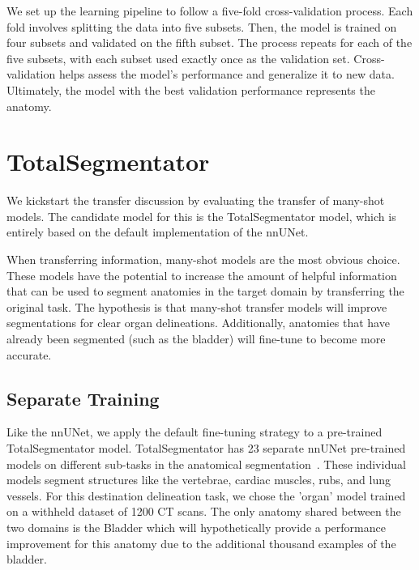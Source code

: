 \documentclass[11pt,twoside]{report}
\begin{document}
We set up the learning pipeline to follow a five-fold cross-validation process. Each fold involves splitting the data into five subsets. Then, the model is trained on four subsets and validated on the fifth subset. The process repeats for each of the five subsets, with each subset used exactly once as the validation set. Cross-validation helps assess the model's performance and generalize it to new data. Ultimately, the model with the best validation performance represents the anatomy.

\section{TotalSegmentator}\label{sect:totalsegmentator}

We kickstart the transfer discussion by evaluating the transfer of many-shot models. The candidate model for this is the TotalSegmentator model, which is entirely based on the default implementation of the nnUNet. 


When transferring information, many-shot models are the most obvious choice. These models have the potential to increase the amount of helpful information that can be used to segment anatomies in the target domain by transferring the original task. The hypothesis is that many-shot transfer models will improve segmentations for clear organ delineations. Additionally, anatomies that have already been segmented (such as the bladder) will fine-tune to become more accurate.

\subsection{Separate Training}

Like the nnUNet, we apply the default fine-tuning strategy to a pre-trained TotalSegmentator model. TotalSegmentator has 23 separate nnUNet pre-trained models on different sub-tasks in the anatomical segmentation~\cite{totalsegmentor-git}. These individual models segment structures like the vertebrae, cardiac muscles, rubs, and lung vessels. For this destination delineation task, we chose the 'organ' model trained on a withheld dataset of 1200 CT scans. The only anatomy shared between the two domains is the Bladder which will hypothetically provide a performance improvement for this anatomy due to the additional thousand examples of the bladder.
\end{document}
